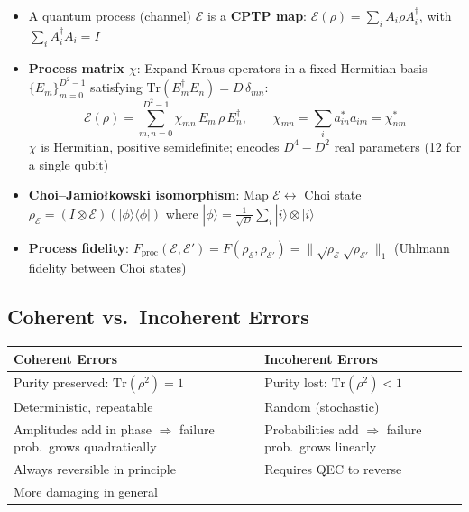 \documentclass[10pt,a4paper]{article}
\begin{document}
\begin{itemize}
  \item A quantum process (channel) $\mathcal{E}$ is a \textbf{CPTP map}: $\mathcal{E}(\rho) = \sum_i A_i \rho A_i^\dagger$, with $\sum_i A_i^\dagger A_i = I$
  \item \textcolor{mathpurple}{\textbf{Process matrix $\chi$}}: Expand Kraus operators in a fixed Hermitian basis $\{E_m\}_{m=0}^{D^2-1}$ satisfying $\mathrm{Tr}(E_m^\dagger E_n) = D\,\delta_{mn}$:
  \begin{equation}
    \mathcal{E}(\rho) = \sum_{m,n=0}^{D^2-1} \chi_{mn}\, E_m\, \rho\, E_n^\dagger, \qquad \chi_{mn} = \sum_i a_{in}^* a_{im} = \chi_{nm}^*
  \end{equation}
  $\chi$ is Hermitian, positive semidefinite; encodes \textcolor{alertred}{$D^4 - D^2$ real parameters} (12 for a single qubit)
  \item \textbf{Choi--Jamio\l{}kowski isomorphism}: Map $\mathcal{E} \leftrightarrow$ Choi state $\rho_\mathcal{E} = (I \otimes \mathcal{E})(|\phi\rangle\langle\phi|)$ where $|\phi\rangle = \frac{1}{\sqrt{D}}\sum_i |i\rangle \otimes |i\rangle$
  \item \textcolor{mathpurple}{\textbf{Process fidelity}}: $F_{\mathrm{proc}}(\mathcal{E}, \mathcal{E}') = F(\rho_\mathcal{E}, \rho_{\mathcal{E}'}) = \|\sqrt{\rho_\mathcal{E}}\sqrt{\rho_{\mathcal{E}'}}\|_1$ (Uhlmann fidelity between Choi states)
\end{itemize}

\subsection{Coherent vs.\ Incoherent Errors}\label{sec:coherent-incoherent}

\begin{keybox}
\begin{tabular}{p{}|p{}}
\textcolor{alertred}{\textbf{Coherent Errors}} & \textcolor{deepblue}{\textbf{Incoherent Errors}} \\
\midrule
Purity preserved: $\mathrm{Tr}(\rho^2) = 1$ & Purity lost: $\mathrm{Tr}(\rho^2) < 1$ \\
Deterministic, repeatable & Random (stochastic) \\
Amplitudes add in phase $\Rightarrow$ failure prob.\ grows \textcolor{alertred}{quadratically} & Probabilities add $\Rightarrow$ failure prob.\ grows linearly \\
Always reversible in principle & Requires QEC to reverse \\
More damaging in general & \\
\end{tabular}
\end{keybox}
\end{document}
